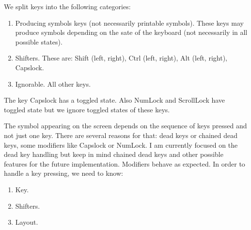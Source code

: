 \documentclass{article}
\begin{document}
We split keys into the following categories:
\begin{enumerate}
\item Producing symbols keys (not necessarily printable symbols). These keys may produce symbols depending on the sate of the keyboard (not necessarily in all possible states).
\item Shifters. These are: Shift (left, right), Ctrl (left, right), Alt (left, right), Capslock.
\item Ignorable. All other keys.
\end{enumerate}
The key Capslock has a toggled state. Also NumLock and ScrollLock have toggled state but we ignore toggled states of these keys.

The symbol appearing on the screen depends on the sequence of keys pressed and not just one key. There are several reasons for that: dead keys or chained dead keys, some modifiers like Capslock or NumLock. I am currently focused on the dead key handling but keep in mind chained dead keys and other possible features for the future implementation. Modifiers behave as expected. In order to handle a key pressing, we need to know:
\begin{enumerate}
\item Key.
\item Shifters.
\item Layout.
\end{enumerate}
\end{document}
